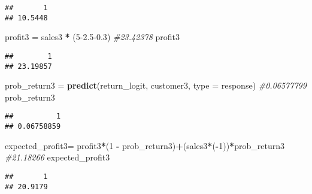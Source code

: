\documentclass[
]{article}
\newenvironment{Shaded}{\begin{snugshade}}{\end{snugshade}}
\newcommand{\AttributeTok}[1]{\textcolor[rgb]{0.13,0.29,0.53}{#1}}
\newcommand{\CommentTok}[1]{\textcolor[rgb]{0.56,0.35,0.01}{\textit{#1}}}
\newcommand{\DecValTok}[1]{\textcolor[rgb]{0.00,0.00,0.81}{#1}}
\newcommand{\FloatTok}[1]{\textcolor[rgb]{0.00,0.00,0.81}{#1}}
\newcommand{\FunctionTok}[1]{\textcolor[rgb]{0.13,0.29,0.53}{\textbf{#1}}}
\newcommand{\NormalTok}[1]{#1}
\newcommand{\OtherTok}[1]{\textcolor[rgb]{0.56,0.35,0.01}{#1}}
\newcommand{\SpecialCharTok}[1]{\textcolor[rgb]{0.81,0.36,0.00}{\textbf{#1}}}
\newcommand{\StringTok}[1]{\textcolor[rgb]{0.31,0.60,0.02}{#1}}
\begin{document}
\begin{verbatim}
##       1 
## 10.5448
\end{verbatim}

\begin{Shaded}
\begin{Highlighting}[]
\NormalTok{profit3 }\OtherTok{=}\NormalTok{ sales3 }\SpecialCharTok{*}\NormalTok{ (}\DecValTok{5}\FloatTok{{-}2.5{-}0.3}\NormalTok{) }\CommentTok{\#23.42378 }
\NormalTok{profit3}
\end{Highlighting}
\end{Shaded}

\begin{verbatim}
##        1 
## 23.19857
\end{verbatim}

\begin{Shaded}
\begin{Highlighting}[]
\NormalTok{prob\_return3 }\OtherTok{=} \FunctionTok{predict}\NormalTok{(return\_logit, customer3, }\AttributeTok{type =} \StringTok{\textquotesingle{}response\textquotesingle{}}\NormalTok{) }\CommentTok{\#0.06577799 }
\NormalTok{prob\_return3}
\end{Highlighting}
\end{Shaded}

\begin{verbatim}
##          1 
## 0.06758859
\end{verbatim}

\begin{Shaded}
\begin{Highlighting}[]
\NormalTok{expected\_profit3}\OtherTok{=}\NormalTok{ profit3}\SpecialCharTok{*}\NormalTok{(}\DecValTok{1} \SpecialCharTok{{-}}\NormalTok{ prob\_return3)}\SpecialCharTok{+}\NormalTok{(sales3}\SpecialCharTok{*}\NormalTok{(}\SpecialCharTok{{-}}\DecValTok{1}\NormalTok{))}\SpecialCharTok{*}\NormalTok{prob\_return3 }\CommentTok{\#21.18266 }
\NormalTok{expected\_profit3}
\end{Highlighting}
\end{Shaded}

\begin{verbatim}
##       1 
## 20.9179
\end{verbatim}
\end{document}
